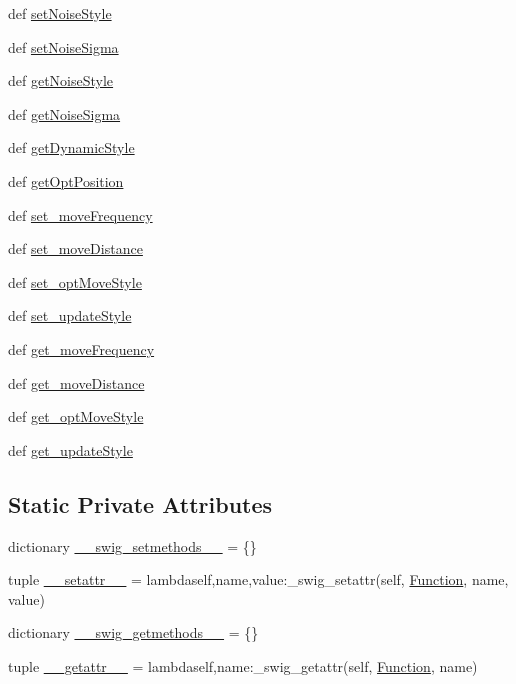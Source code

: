 \begin{CompactItemize}
\item 
def \hyperlink{classpso_1_1Function_d1fbe76a7087621326b7bc1c29076704}{setNoiseStyle}
\item 
def \hyperlink{classpso_1_1Function_b42bbaac0bf52ef8b09b92d29f23e37b}{setNoiseSigma}
\item 
def \hyperlink{classpso_1_1Function_a6d712e3ddbea4eb72e83d40f51b8b4c}{getNoiseStyle}
\item 
def \hyperlink{classpso_1_1Function_5f7b9b3753e6501d12711d74234bb6ac}{getNoiseSigma}
\item 
def \hyperlink{classpso_1_1Function_bcbf334641bdedf80d15c08505951db8}{getDynamicStyle}
\item 
def \hyperlink{classpso_1_1Function_f986351a95b4937d390fa6803e7a845b}{getOptPosition}
\item 
def \hyperlink{classpso_1_1Function_76aee0acd25d5a9b207a307369b80f1b}{set\_\-moveFrequency}
\item 
def \hyperlink{classpso_1_1Function_2376cbe3a5701668c87049794b47b0db}{set\_\-moveDistance}
\item 
def \hyperlink{classpso_1_1Function_1a6dbfccf99208be62712a999eb041b9}{set\_\-optMoveStyle}
\item 
def \hyperlink{classpso_1_1Function_881d3f6532171a36f736edf783c6b10b}{set\_\-updateStyle}
\item 
def \hyperlink{classpso_1_1Function_c9d5dace0aa15c12eff310496a978ad5}{get\_\-moveFrequency}
\item 
def \hyperlink{classpso_1_1Function_03d8ad4749da59e8031e18d4bddff6c4}{get\_\-moveDistance}
\item 
def \hyperlink{classpso_1_1Function_f70f31465c6e4464cafbe2710352e18b}{get\_\-optMoveStyle}
\item 
def \hyperlink{classpso_1_1Function_f09d4d5ef25e3158fed9d0255a5a5748}{get\_\-updateStyle}
\end{CompactItemize}
\subsection*{Static Private Attributes}
\begin{CompactItemize}
\item 
dictionary \hyperlink{classpso_1_1Function_2334bfe507115d58047f67960dde71d3}{\_\-\_\-swig\_\-setmethods\_\-\_\-} = \{\}
\item 
tuple \hyperlink{classpso_1_1Function_cd8775cf6aadc3fdf4e6d82158ef10fb}{\_\-\_\-setattr\_\-\_\-} = lambdaself,name,value:\_\-swig\_\-setattr(self, \hyperlink{classpso_1_1Function}{Function}, name, value)
\item 
dictionary \hyperlink{classpso_1_1Function_5bddc07dbaab0ee579488bdcc8103a71}{\_\-\_\-swig\_\-getmethods\_\-\_\-} = \{\}
\item 
tuple \hyperlink{classpso_1_1Function_affeed856b337656e88895fa35321496}{\_\-\_\-getattr\_\-\_\-} = lambdaself,name:\_\-swig\_\-getattr(self, \hyperlink{classpso_1_1Function}{Function}, name)
\end{CompactItemize}


